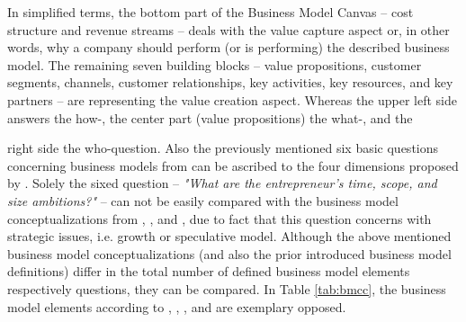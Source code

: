 In simplified terms, the bottom part of the Business Model Canvas -- cost structure and revenue streams -- deals with the value capture aspect or, in other words, why a company should perform (or is performing) the described business model. The remaining seven building blocks -- value propositions, customer segments, channels, customer relationships, key activities, key resources, and key partners -- are representing the value creation aspect. Whereas the upper left side answers the how-, the center part (value propositions) the what-, and the\linebreak 
\vspace*{-\baselineskip}
 
\noindent
right side the who-question. Also the previously mentioned six basic questions concerning business models from \citet[pp. 729-732]{Morris2005} can be ascribed to the four dimensions proposed by \citet{Frankenberger2013}. Solely the sixed question -- \textit{"What are the entrepreneur's time, scope, and size ambitions?"} -- can not be easily compared with the business model conceptualizations from \citet{Johnson2008}, \citet{Osterwalder2010}, and \citet{Frankenberger2013}, due to fact that this question concerns with strategic issues, i.e. growth or speculative model. Although the above mentioned business model conceptualizations (and also the prior introduced business model definitions) differ in the total number of defined business model elements respectively questions, they can be compared. In Table \ref{tab:bmcc}, the business model elements according to \citet{Johnson2008}, \citet{Osterwalder2010}, \citet{Morris2005}, and \citet{Frankenberger2013} are exemplary opposed.


